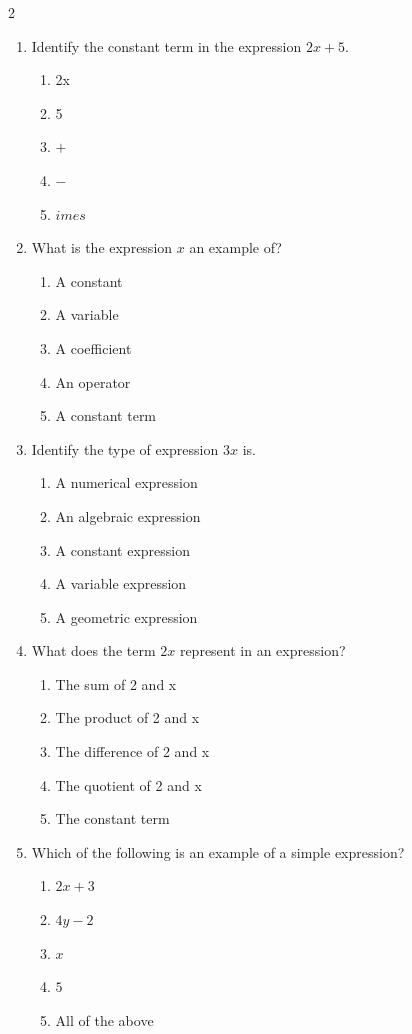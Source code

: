 \documentclass[10pt]{article}
\begin{document}
\begin{multicols}{2}
\begin{enumerate}[label=\textbf{Q\arabic*.}, leftmargin=*, itemsep=6pt, parsep=0pt]
  \item \small Identify the constant term in the expression $2x + 5$.
  \begin{enumerate}[label=(\Alph*), leftmargin=0.6cm, nosep, itemsep=2pt]
    \item 2x
    \item 5
    \item $+$
    \item $-$
    \item $	imes$
  \end{enumerate}

  \item \small What is the expression $x$ an example of?
  \begin{enumerate}[label=(\Alph*), leftmargin=0.6cm, nosep, itemsep=2pt]
    \item A constant
    \item A variable
    \item A coefficient
    \item An operator
    \item A constant term
  \end{enumerate}

  \item \small Identify the type of expression $3x$ is.
  \begin{enumerate}[label=(\Alph*), leftmargin=0.6cm, nosep, itemsep=2pt]
    \item A numerical expression
    \item An algebraic expression
    \item A constant expression
    \item A variable expression
    \item A geometric expression
  \end{enumerate}

  \item \small What does the term $2x$ represent in an expression?
  \begin{enumerate}[label=(\Alph*), leftmargin=0.6cm, nosep, itemsep=2pt]
    \item The sum of 2 and x
    \item The product of 2 and x
    \item The difference of 2 and x
    \item The quotient of 2 and x
    \item The constant term
  \end{enumerate}

  \item \small Which of the following is an example of a simple expression?
  \begin{enumerate}[label=(\Alph*), leftmargin=0.6cm, nosep, itemsep=2pt]
    \item $2x + 3$
    \item $4y - 2$
    \item $x$
    \item $5$
    \item All of the above
  \end{enumerate}


\end{enumerate}
\end{multicols}
\end{document}
